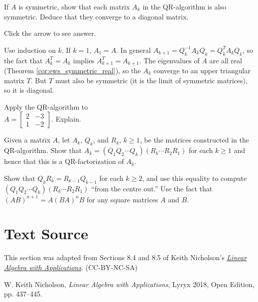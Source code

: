 \documentclass{ximera}
\begin{document}
\begin{problem}\label{prob:QR-symmetric}
If $A$ is symmetric, show that each matrix $A_{k}$ in the QR-algorithm is also symmetric. Deduce that they converge to a diagonal matrix.

Click the arrow to see answer.
\begin{expandable}
Use induction on $k$. If $k = 1$, $A_{1} = A$. In general $A_{k+1} = Q_{k}^{-1}A_{k}Q_{k} = Q_{k}^{T}A_{k}Q_{k}$, so the fact that $A_{k}^{T} = A_{k}$ implies $A_{k+1}^{T} = A_{k+1}$. The eigenvalues of $A$ are all real (Theorem \ref{cor:ews_symmetric_real}), so the $A_{k}$ converge to an upper triangular matrix $T$. But $T$ must also be symmetric (it is the limit of symmetric matrices), so it is diagonal.
\end{expandable}
\end{problem}

\begin{problem}\label{QR-special-2x2}
Apply the QR-algorithm to \\ $A = \left[ \begin{array}{rr}
2 & -3 \\
1 & -2
\end{array}\right]$. Explain.
\end{problem}

\begin{problem}\label{prob:analyzeQRalgorithm}
Given a matrix $A$, let $A_{k}$, $Q_{k}$, and $R_{k}$, $k \geq 1$, be the matrices constructed in the QR-algorithm. Show that $A_{k} = (Q_{1}Q_{2} \cdots Q_{k})(R_{k} \cdots R_{2}R_{1})$ for each $k \geq 1$ and hence that this is a QR-factorization of $A_{k}$. 
\begin{hint}
Show that $Q_{k}R_{k} = R_{k-1}Q_{k-1}$ for each $k \geq 2$, and use this equality to compute $(Q_{1}Q_{2} \cdots Q_{k})(R_{k} \cdots R_{2}R_{1})$ ``from the centre out.'' Use the fact that $(AB)^{n+1} = A(BA)^{n}B$ for any square matrices $A$ and $B$.
\end{hint}
\end{problem}

\section*{Text Source} This section was adapted from Sections 8.4 and 8.5 of Keith Nicholson's \href{https://open.umn.edu/opentextbooks/textbooks/linear-algebra-with-applications}{\it Linear Algebra with Applications}. (CC-BY-NC-SA)

W. Keith Nicholson, {\it Linear Algebra with Applications}, Lyryx 2018, Open Edition, pp. 437--445.
\end{document}

